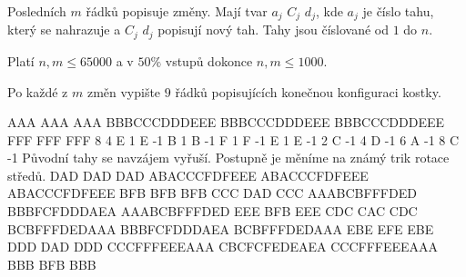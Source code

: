 Posledních $m$ řádků popisuje změny.
Mají tvar $a_j$ $C_j$ $d_j$,
kde $a_j$ je číslo tahu, který se nahrazuje
a $C_j$ $d_j$ popisují nový tah.
Tahy jsou číslované od $1$ do $n$.

\smallskip

Platí $n,m \leq 65000$
a v $50\%$ vstupů dokonce
$n,m \leq 1000$.


Po každé z $m$ změn vypište $9$ řádků
popisujících konečnou konfiguraci kostky.


\sampleIN
AAA
AAA
AAA
BBBCCCDDDEEE
BBBCCCDDDEEE
BBBCCCDDDEEE
FFF
FFF
FFF
8 4
E 1
E -1
B 1
B -1
F 1
F -1
E 1
E -1
2 C -1
4 D -1
6 A -1
8 C -1
\sampleCOMMENT
Původní tahy se navzájem vyřuší.
Postupně je měníme na známý trik
rotace středů.
\sampleOUT
DAD
DAD
DAD
ABACCCFDFEEE
ABACCCFDFEEE
ABACCCFDFEEE
BFB
BFB
BFB
CCC
DAD
CCC
AAABCBFFFDED
BBBFCFDDDAEA
AAABCBFFFDED
EEE
BFB
EEE
CDC
CAC
CDC
BCBFFFDEDAAA
BBBFCFDDDAEA
BCBFFFDEDAAA
EBE
EFE
EBE
DDD
DAD
DDD
CCCFFFEEEAAA
CBCFCFEDEAEA
CCCFFFEEEAAA
BBB
BFB
BBB
\sampleEND



